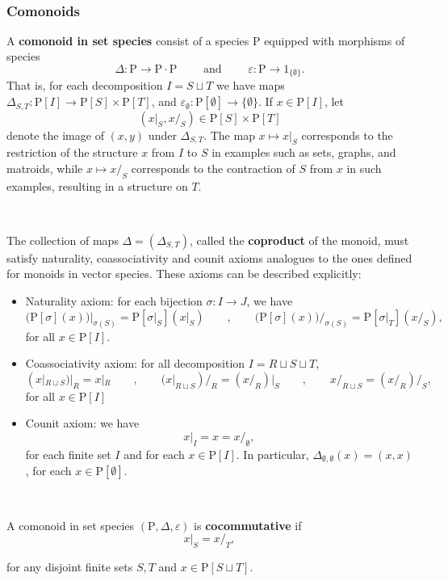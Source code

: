 \documentclass[12pt, reqno]{amsart}
\theoremstyle{definition}
\newcommand{\rP}{\mathrm{P}}
\begin{document}
\

\subsubsection{Comonoids}
A {\bf comonoid in set species} consist of a species $\rP$ equipped with morphisms of species
\[\Delta:\rP \to \rP \cdot \rP \qquad \text{ and } \qquad \varepsilon: \rP \to \mathrm{1}_{\{\emptyset \} }. \]
That is, for each decomposition $I=S \sqcup T$ we have maps $\Delta_{S,T}: \rP[I]\to \rP[S] \times \rP[T]$, and $\varepsilon_\emptyset: \rP[\emptyset] \to \{\emptyset\}$. If $x \in \rP[I]$,  let 
\[(x|_S, x /_S)\in \rP[S]\times \rP[T]\]
denote the image of $(x,y)$ under $\Delta_{S,T}$. The map $x \mapsto x|_S$ corresponds to the restriction of the structure $x$ from $I$ to $S$ in examples such as sets, graphs, and matroids, while $x \mapsto x/_S$ corresponds to the contraction of $S$ from $x$ in such examples, resulting in a structure on $T$.

\

The collection of maps $\Delta=(\Delta_{S,T})$, called the {\bf coproduct} of the monoid, must satisfy naturality, coassociativity and counit axioms analogues to the ones defined for monoids in vector species.
These axioms can be described explicitly:
\begin{itemize}
    \item Naturality axiom: for each bijection $\sigma: I \to J$,  we have
\[{\Big (}\rP[\sigma](x){\Big )}\Big|_{\sigma(S)}=\rP[\sigma|_S](x|_S) \qquad , \qquad {\Big (}\rP[\sigma](x){\Big )}\Big/_{\sigma(S)}=\rP[\sigma|_T](x/_S),\]
for all $x \in \rP[I]$.
\vspace{.1in}
\item Coassociativity axiom: for all decomposition $I=R \sqcup S \sqcup T$, \[(x|_{R\sqcup S})|_R=x|_R \qquad , \qquad (x|_{R\sqcup S})/_R=(x/_R)|_S \qquad , \qquad x/_{R \sqcup S}=(x/_R)/_S, \]
for all $x \in \rP[I]$
\vspace{.1in}
\item Counit axiom: we have
\[x|_I= x = x/_\emptyset,\]
for each finite set $I$ and for each $x \in \rP[I]$. In particular, $\Delta_{\emptyset, \emptyset}(x)=(x,x)$, for each $x \in \rP[\emptyset]$.
\end{itemize}

\


A comonoid in set species $(\rP, \Delta, \varepsilon)$ is {\bf cocommutative} if
\[x|_S=x/_T,\]

for any disjoint finite sets $S, T$ and $x \in \rP[S\sqcup T]$.
\end{document}
